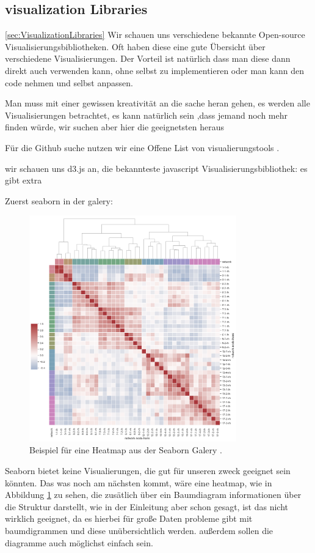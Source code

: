 \subsection{visualization Libraries} \ref{sec:VisualizationLibraries}
Wir schauen uns verschiedene bekannte Open-source Visualisierungsbibliotheken. Oft haben diese eine gute Übersicht über verschiedene Visualisierungen. Der Vorteil ist natürlich dass man diese dann direkt auch verwenden kann, ohne selbst zu implementieren oder man kann den code nehmen und selbst anpassen.

Man muss mit einer gewissen kreativität an die sache heran gehen, es werden alle Visualisierungen betrachtet, es kann natürlich sein ,dass jemand noch mehr finden würde, wir suchen aber hier die geeignetsten heraus

Für die Github suche nutzen wir eine Offene List von visualierungstools \cite{awesome_2025}.

wir schauen uns d3.js an, die bekannteste javascript Visualisierungsbibliothek:
es gibt extra 


Zuerst seaborn in der galery: \cite{seaborngalery}
\begin{figure}
    \centering
    \includegraphics[width=0.8\textwidth]{images/structureHeatmapSeaborn.png}
    \caption{Beispiel für eine Heatmap aus der Seaborn Galery \cite{seaborngalery}.}
    \label{fig:seabornHeatmap} 
\end{figure}
Seaborn bietet keine Visualierungen, die gut für unseren zweck geeignet sein könnten. Das was noch am nächsten kommt, wäre eine heatmap, wie in Abbildung \ref{fig:seabornHeatmap} zu sehen, die zusätlich über ein Baumdiagram informationen über die Struktur darstellt, wie in der Einleitung aber schon gesagt, ist das nicht wirklich geeignet, da es hierbei für große Daten probleme gibt mit baumdigrammen und diese unübersichtlich werden.
außerdem sollen die diagramme auch möglichst einfach sein.


